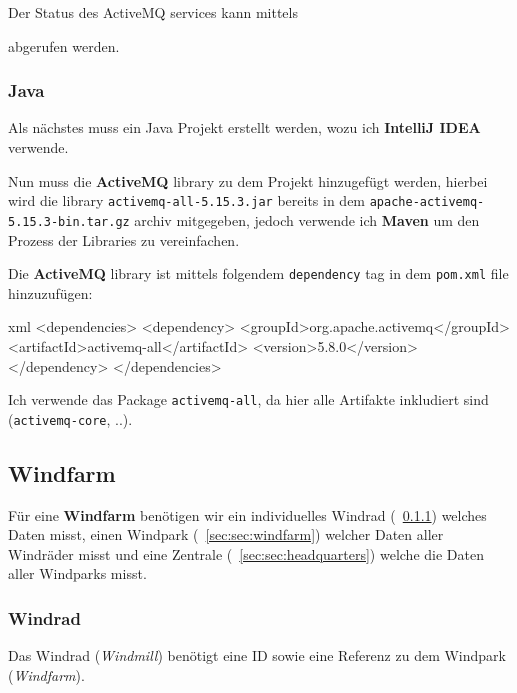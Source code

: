 Der Status des ActiveMQ services kann mittels


abgerufen werden.

\subsubsection{Java}

Als nächstes muss ein Java Projekt erstellt werden, wozu ich \textbf{IntelliJ IDEA} verwende.

Nun muss die \textbf{ActiveMQ} library zu dem Projekt hinzugefügt werden, hierbei wird die library \texttt{activemq-all-5.15.3.jar} bereits in dem \texttt{apache-activemq-5.15.3-bin.tar.gz} archiv mitgegeben, jedoch verwende ich \textbf{Maven} um den Prozess der Libraries zu vereinfachen.

Die \textbf{ActiveMQ} library ist mittels folgendem \texttt{dependency} tag in dem \texttt{pom.xml} file hinzuzufügen:

\begin{code}{xml}
<dependencies>
    <dependency>
        <groupId>org.apache.activemq</groupId>
        <artifactId>activemq-all</artifactId>
        <version>5.8.0</version>
    </dependency>
</dependencies>
\end{code}

Ich verwende das Package \texttt{activemq-all}, da hier alle Artifakte inkludiert sind (\texttt{activemq-core}, ..).

\clearpage




\subsection{Windfarm}

Für eine \textbf{Windfarm} benötigen wir ein individuelles Windrad (~\ref{sec:windmill}) welches Daten misst, einen Windpark (~\ref{sec:sec:windfarm}) welcher Daten aller Windräder misst und eine Zentrale (~\ref{sec:sec:headquarters}) welche die Daten aller Windparks misst.

\subsubsection{Windrad}
\label{sec:windmill}

Das Windrad (\textit{Windmill}) benötigt eine ID sowie eine Referenz zu dem Windpark (\textit{Windfarm}).


